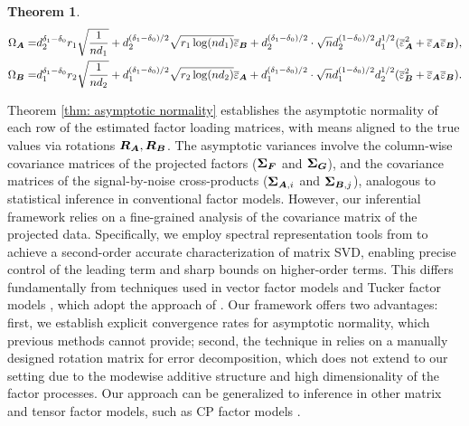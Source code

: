 \documentclass[11pt,letterpaper]{article}
\newtheorem{theorem}{Theorem}[section]
\theoremstyle{definition}
\begin{document}
\begin{theorem}
\begin{align*}
\Omega_{\boldsymbol{A}}
= & d_2^{\delta_1-\delta_0}r_1\sqrt{\frac{1}{nd_1}} + d_2^{(\delta_1-\delta_0)/2} \sqrt{r_1\log(nd_1)} \overline{\varepsilon}_{\boldsymbol{B}} + d_2^{(\delta_1-\delta_0)/2} \cdot \sqrt{n} d_2^{(1-\delta_0)/2}d_1^{1/2} (\overline{\varepsilon}_{\boldsymbol{A}}^2 + \overline{\varepsilon}_{\boldsymbol{A}}\overline{\varepsilon}_{\boldsymbol{B}} ), \\    
\Omega_{\boldsymbol{B}}
= & d_1^{\delta_1-\delta_0}r_2 \sqrt{\frac{1}{nd_2}} + d_1^{(\delta_1-\delta_0)/2}  \sqrt{r_2\log(nd_2)} \overline{\varepsilon}_{\boldsymbol{A}} + d_1^{(\delta_1-\delta_0)/2} \cdot \sqrt{n} d_1^{(1-\delta_0)/2}d_2^{1/2}  (\overline{\varepsilon}_{\boldsymbol{B}}^2 + \overline{\varepsilon}_{\boldsymbol{A}}\overline{\varepsilon}_{\boldsymbol{B}} ).
\end{align*}
\end{theorem}




Theorem \ref{thm: asymptotic normality} establishes the asymptotic normality of each row of the estimated factor loading matrices, with means aligned to the true values via rotations $\boldsymbol{R}_{\boldsymbol{A}},\boldsymbol{R}_{\boldsymbol{B}}$. The asymptotic variances involve the column-wise covariance matrices of the projected factors ($\boldsymbol{\Sigma}_{\boldsymbol{F}}$ and $\boldsymbol{\Sigma}_{\boldsymbol{G}}$), and the covariance matrices of the signal-by-noise cross-products ($\boldsymbol{\Sigma}_{\boldsymbol{A},i}$ and $\boldsymbol{\Sigma}_{\boldsymbol{B},j}$), analogous to statistical inference in conventional factor models. However, our inferential framework relies on a fine-grained analysis of the covariance matrix of the projected data. Specifically, we employ spectral representation tools from \cite{xia2021normal} to achieve a second-order accurate characterization of matrix SVD, enabling precise control of the leading term and sharp bounds on higher-order terms. This differs fundamentally from techniques used in vector factor models \citep{bai2003inferential} and Tucker factor models \citep{chen2023statistical, yu2022projected}, which adopt the approach of \cite{bai2003inferential}. Our framework offers two advantages: first, we establish explicit convergence rates for asymptotic normality, which previous methods cannot provide; second, the technique in \cite{bai2003inferential} relies on a manually designed rotation matrix for error decomposition, which does not extend to our setting due to the modewise additive structure and high dimensionality of the factor processes. Our approach can be  generalized to inference in other matrix and tensor factor models, such as CP factor models \citep{chang2023modelling,chang2024identification}.
\end{document}
